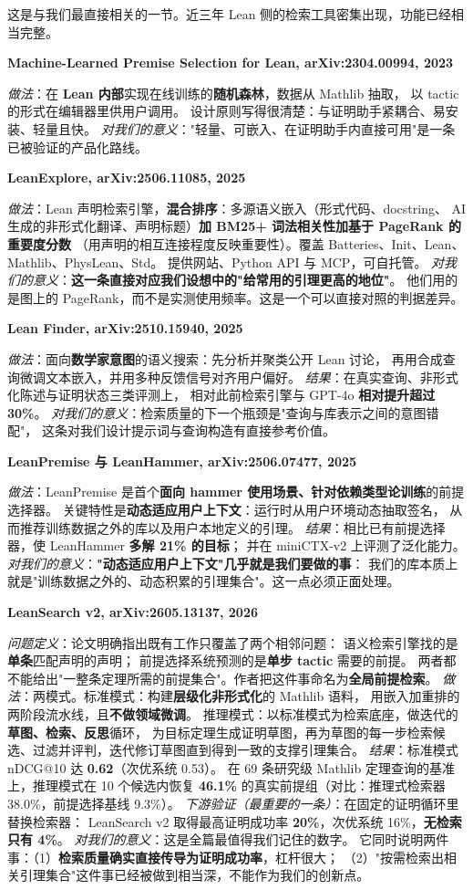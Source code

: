 \documentclass[UTF8,a4paper,11pt,fontset=windows]{ctexart}
\newcommand{\lp}[1]{\path{#1}}
\newcommand{\paper}[1]{\par\medskip\noindent\textbf{\color{sgblue!80!black}#1}\par\nobreak\vspace{1pt}}
\newcommand{\field}[1]{\textit{#1}：}
\begin{document}
这是与我们最直接相关的一节。近三年 Lean 侧的检索工具密集出现，功能已经相当完整。

\paper{Machine-Learned Premise Selection for Lean, arXiv:2304.00994, 2023}
\field{做法}在 \textbf{Lean 内部}实现在线训练的\textbf{随机森林}，数据从 Mathlib 抽取，
以 \lp{suggest_premises} tactic 的形式在编辑器里供用户调用。
设计原则写得很清楚：与证明助手紧耦合、易安装、轻量且快。
\field{对我们的意义}"轻量、可嵌入、在证明助手内直接可用"是一条已被验证的产品化路线。

\paper{LeanExplore, arXiv:2506.11085, 2025}
\field{做法}Lean 声明检索引擎，\textbf{混合排序}：多源语义嵌入（形式代码、docstring、
AI 生成的非形式化翻译、声明标题）\textbf{加 BM25+ 词法相关性}\textbf{加基于 PageRank 的重要度分数}
（用声明的相互连接程度反映重要性）。覆盖 Batteries、Init、Lean、Mathlib、PhysLean、Std。
提供网站、Python API 与 MCP，可自托管。
\field{对我们的意义}\textbf{这一条直接对应我们设想中的"给常用的引理更高的地位"}。
他们用的是图上的 PageRank，而不是实测使用频率。这是一个可以直接对照的判据差异。

\paper{Lean Finder, arXiv:2510.15940, 2025}
\field{做法}面向\textbf{数学家意图}的语义搜索：先分析并聚类公开 Lean 讨论，
再用合成查询微调文本嵌入，并用多种反馈信号对齐用户偏好。
\field{结果}在真实查询、非形式化陈述与证明状态三类评测上，
相对此前检索引擎与 GPT-4o \textbf{相对提升超过 30\%}。
\field{对我们的意义}检索质量的下一个瓶颈是"查询与库表示之间的意图错配"，
这条对我们设计提示词与查询构造有直接参考价值。

\paper{LeanPremise 与 LeanHammer, arXiv:2506.07477, 2025}
\field{做法}LeanPremise 是首个\textbf{面向 hammer 使用场景、针对依赖类型论训练}的前提选择器。
关键特性是\textbf{动态适应用户上下文}：运行时从用户环境动态抽取签名，
从而推荐训练数据之外的库以及用户本地定义的引理。
\field{结果}相比已有前提选择器，使 LeanHammer \textbf{多解 21\% 的目标}；
并在 miniCTX-v2 上评测了泛化能力。
\field{对我们的意义}\textbf{"动态适应用户上下文"几乎就是我们要做的事}：
我们的库本质上就是"训练数据之外的、动态积累的引理集合"。这一点必须正面处理。

\paper{LeanSearch v2, arXiv:2605.13137, 2026}
\field{问题定义}论文明确指出既有工作只覆盖了两个相邻问题：
语义检索引擎找的是\textbf{单条}匹配声明的声明；
前提选择系统预测的是\textbf{单步 tactic} 需要的前提。
两者都不能给出"一整条定理所需的前提集合"。作者把这件事命名为\textbf{全局前提检索}。
\field{做法}两模式。标准模式：构建\textbf{层级化非形式化}的 Mathlib 语料，
用嵌入加重排的两阶段流水线，且\textbf{不做领域微调}。
推理模式：以标准模式为检索底座，做迭代的\textbf{草图、检索、反思}循环，
为目标定理生成证明草图，再为草图的每一步检索候选、过滤并评判，迭代修订草图直到得到一致的支撑引理集合。
\field{结果}标准模式 nDCG@10 达 \textbf{0.62}（次优系统 0.53）。
在 69 条研究级 Mathlib 定理查询的基准上，推理模式在 10 个候选内恢复
\textbf{46.1\%} 的真实前提组（对比：推理式检索器 38.0\%，前提选择基线 9.3\%）。
\field{下游验证（最重要的一条）}在固定的证明循环里替换检索器：
LeanSearch v2 取得最高证明成功率 \textbf{20\%}，次优系统 16\%，\textbf{无检索只有 4\%}。
\field{对我们的意义}这是全篇最值得我们记住的数字。
它同时说明两件事：（1）\textbf{检索质量确实直接传导为证明成功率}，杠杆很大；
（2）"按需检索出相关引理集合"这件事已经被做到相当深，不能作为我们的创新点。
\end{document}
